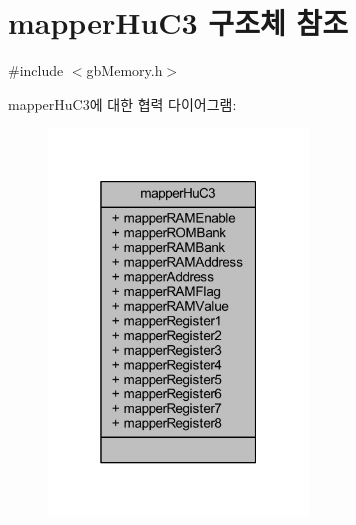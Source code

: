 \hypertarget{structmapper_hu_c3}{}\section{mapper\+Hu\+C3 구조체 참조}
\label{structmapper_hu_c3}


{\ttfamily \#include $<$gb\+Memory.\+h$>$}



mapper\+Hu\+C3에 대한 협력 다이어그램\+:\nopagebreak
\begin{figure}[H]
\begin{center}
\leavevmode
\includegraphics[width=196pt]{structmapper_hu_c3__coll__graph}
\end{center}
\end{figure}
